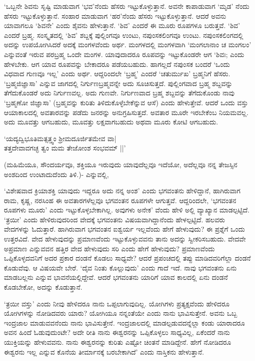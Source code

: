 `ಒಬ್ಬನೇ ಶಿವನು ಸೃಷ್ಟಿ ಮಾಡುವಾಗ `ಭವ'ನೆಂದು ಹೆಸರು ಇಟ್ಟುಕೊಳ್ಳುತ್ತಾನೆ. ಅವನೇ ಕಾಪಾಡುವಾಗ `ಮೃಡ' ನೆಂದು ಹೆಸರು ಇಟ್ಟುಕೊಳ್ಳುತ್ತಾನೆ. ಸಂಹಾರ ಮಾಡುವಾಗ `ಹರ'ನೆಂದು ಹೆಸರು ಇಟ್ಟುಕೊಳ್ಳುತ್ತಾನೆ. ಆದರೆ ಅವನು ಯಾವಾಗಲೂ `ಶಿವನೇ' ಎಂದು ಶೈವನು ಹೇಳುತ್ತಾನೆ. `ಶಿವ' ಎಂದರೆ ಈ ಮೂರು ರೂಪಗಳೂ ಬರುತ್ತವೆ. `ಶಿವ' ಎಂದರೆ ಬ್ರಹ್ಮ. ಸಂಸ್ಕೃತದಲ್ಲಿ `ಶಿವ' ಶಬ್ದಕ್ಕೆ ಪುಲ್ಲಿಂಗವೂ ಉಂಟು, ನಪುಂಸಕಲಿಂಗವೂ ಉಂಟು. ನಪುಂಸಕಲಿಂಗದಲ್ಲಿ ಅದನ್ನು ಉಪಯೋಗಿಸಿದರೆ ಅದಕ್ಕೆ ಮಂಗಳವೆಂದು ಅರ್ಥ. ಮಂಗಳದಲ್ಲಿ ಮಂಗಳವಾಗಿ `ಮಂಗಲಾನಾಂ ಚ ಮಂಗಲಂ' ಎನ್ನುವಂತೆ ಇರುವ ಪರಬ್ರಹ್ಮ ಒಂದೇ ಮಂಗಳ. ಯಾವುದಾದರೂ ರೂಪವನ್ನು ಇಟ್ಟುಕೊಂಡರೇ ಆಗ `ಶಿವಃ; ಎಂದು ಹೇಳಬೇಕು. ಆಗ ಯಾವ ರೂಪವನ್ನು ಬೇಕಾದರೂ ಪಡೆಯಬಹುದು. ಹಾಗಲ್ಲದೆ ನಪುಂಸಕ ಬಂದರೆ `ಒಂದು ವಿಧವಾದ ಗುಣವೂ ಇಲ್ಲ' ಎಂದು ಅರ್ಥ. ಆದ್ದರಿಂದಲೇ `ಬ್ರಹ್ಮ' ಎಂದರೆ `ಚತುರ್ಮುಖ' ಬ್ರಹ್ಮನಿಗೆ ಹೆಸರು. `ಬ್ರಹ್ಮಜಿಜ್ಞಾಸಾ' ಎನ್ನುವ ಜಾಗದಲ್ಲಿ ನಿರ್ಗುಣಬ್ರಹ್ಮವನ್ನೇ ಅದು ಸೂಚಿಸುತ್ತದೆ. ಪುಲ್ಲಿಂಗವಾದ ಬ್ರಹ್ಮ ಶಬ್ದವನ್ನು ತೆಗೆದುಕೊಂಡರೆ ಅದು ನಿರ್ಗುಣವಲ್ಲ. ಅದು ಗುಣವೇ. ನಿರ್ಗುಣವಾದ ಬ್ರಹ್ಮ ಶಬ್ದವನ್ನು ತೆಗೆದುಕೊಂಡು ನಾವು `ಬ್ರಹ್ಮಣೋ ಜಿಜ್ಞಾಸಾ' (ಬ್ರಹ್ಮವನ್ನು ಕುರಿತು ತಿಳಿದುಕೊಳ್ಳೆಬೇಕೆನ್ನುವ ಆಸೆ) ಎಂದು ಹೇಳುತ್ತೇವೆ. ಆದರೆ ಒಂದು ವಸ್ತು ಆಯಾಕಾಲದಲ್ಲಿ ಅವತಾರವನ್ನು ಪಡೆದು ಜನರನ್ನು ಅನುಗ್ರಹಿಸುತ್ತದೆ. ಅವತಾರ ಮೂರೇ ಇರಬೇಕೆಂಬ ನಿಯಮವಲ್ಲ. ಅದು ಮೂವತ್ತು ಆಗಬಹುದು, ಮೂವತ್ತು ಲಕ್ಷವಾಗಬಹುದು ಅಥವಾ ಮೂರು ಕೋಟಿ ಆಗಬಹುದು.

\begin{shloka}
`ಯದ್ಯದ್ವಿಭೂತಿಮತ್ಸತ್ತ್ವಂ ಶ್ರೀಮದೂರ್ಜಿತಮೇವ ವಾ‌|\\
ತತ್ತದೇವಾವಗಚ್ಛ ತ್ವಂ ಮಮ ತೇಜೋಂಶ ಸಂಭವಮ್ ||'
\end{shloka}

(ಮಹಿಮೆಯೂ, ಸೌಂದರ್ಯವೂ, ಶಕ್ತಿಯೂ ಇರುವುದು ಯಾವುದೆಲ್ಲವೂ ಇದೆಯೋ, ಅದೆಲ್ಲವೂ ನನ್ನ ತೇಜಸ್ಸಿನ ಅಂಶದಿಂದ ಉಂಟಾದುದೆಂದು ತಿಳಿ.)- ಎನ್ನುವಲ್ಲಿ,

`ವಿಶೇಷವಾದ ಕ್ರಿಯಾಶಕ್ತಿ ಯಾವುದು ಇದ್ದರೂ ಅದು ನನ್ನ ಅಂಶ' ಎಂದು ಭಗವಂತನು ಹೇಳಿದ್ದಾನೆ, ಹಾಗಿರುವಾಗ ರಾಮ, ಕೃಷ್ಣ, ನರಸಿಂಹ ಈ ಅವತಾರಗಳೆಲ್ಲವೂ ಭಗವಂತನ ರೂಪಗಳೇ ಆಗುತ್ತವೆ. ಆದ್ದರಿಂದಲೇ, `ಭಗವಂತನ ರೂಪಗಳು ಮೂರು' ಎಂದು ಇಟ್ಟುಕೊಳ್ಳಬೇಕಾಗಿಲ್ಲ. ಅವುಗಳು ಅನೇಕ' ವೆಂದು ಹೇಳಿ ಅಲ್ಲಿ ವ್ಯಾಖ್ಯಾನ ಮಾಡಲ್ಪಟ್ಟಿದೆ. `ತ್ರಯೀ' ಎಂದು ಹೇಳಿರುವುದರಿಂದ ವೇದಕ್ಕೆ ಭಗವಂತನು ವಿಷಯವಾಗಿದ್ದಾನೆಂದು ಹೇಳಲ್ಪಟ್ಟಿದೆ. ಹಲವರು ವೇದಗಳನ್ನು ಓದುತ್ತಾರೆ. ಹಾಗಿರುವಾಗ ಭಗವಂತನ ಐಶ್ವರ್ಯ ಇಲ್ಲವೆಂದು ಹೇಗೆ ಹೇಳುವುದು? ಈ ಪ್ರಶ್ನೆಗೆ ಒಂದು ಉತ್ತರವಿದೆ. ವೇದ ಹೇಳುವುದನ್ನು ಪ್ರಮಾಣವೆಂದು ಇಟ್ಟುಕೊಳ್ಳುವವನು ತಾನು ಅದನ್ನು  ಸ್ವೀಕರಿಸಬಹುದು. ವೇದವೇ ಅಪ್ರಮಾಣ ಎನ್ನುವವನ ಹತ್ತಿರ ವೇದ ಹೇಳುವುದು ಸರಿ ಎಂದು ಹೇಗೆ ಹೇಳುವುದು? ಪ್ರಮಾಣವೆಂದು ಒಪ್ಪಿಕೊಳ್ಳದವನಿಗೆ ಅದರ ಪ್ರಕಾರ ದಂಡನೆ ಕೊಡಲು ಸಾಧ್ಯವೇ? ಆದರೆ ಪ್ರಪಂಚದಲ್ಲಿ ತಪ್ಪು ಮಾಡಿದವರಿಗೆಲ್ಲಾ ದಂಡನೆ ಕೊಡುವೆವು. ಆ ವಿಷಯವೇ ಬೇರೆ. `ದೈವ ನಿಂತು ಕೊಲ್ಲುವುದು' ಎಂದು ಗಾದೆ ಇದೆ. ನಾವು ಭಗವಂತನು ಏನು ಮಾಡಬಲ್ಲನು ಎನ್ನುವ ಭಾವನೆಯಲ್ಲಿದ್ದೇವೆ. ಆದರೆ ಭಗವಂತನು ಯಾರಿಗೆ ಯಾವ ಕಾಲದಲ್ಲಿ ಏನು ದಂಡನೆ ಕೊಡಬೇಕೋ, ಅದನ್ನು ಕೊಡುತ್ತಾನೆ.

`ತ್ರಯೀ ವಸ್ತು' ಎಂದು ನೀವು ಹೇಳಿದರೂ ನಾನು ಒಪ್ಪಲಾಗುವುದಿಲ್ಲ. ಯೋಗಿಗಳು ಪ್ರತ್ಯಕ್ಷವೆಂದು ಹೇಳಿದರೂ ಯೋಗಿಗಳನ್ನು ನೋಡಿದವರು ಯಾರು? ಯೋಗಿಯೂ ನನ್ನಂತೆಯೇ ಎಂದು ನಾನು ಭಾವಿಸುತ್ತೇನೆ. ಅವನು ಒಬ್ಬ ಇಂದ್ರಜಾಲ ಮಾಡುವವನೆಂದು ನಾನು ಭಾವಿಸುತ್ತೇನೆ. ಇಂದ್ರಜಾಲದಲ್ಲಿ ಮಾಡಲ್ಪಡುವದನ್ನೆಲ್ಲಾ ಕಂಡು ಯಾರಾದರೂ ಅವನ ಹಿಂದೆ ಓಡುವುದುಂಟೇ? ಅದೇ ರೀತಿ ನಾನು ಈಶ್ವರನನ್ನು ಒಪ್ಪಿಕೊಳ್ಳಲು ಸಾಧ್ಯವಿಲ್ಲ, ಏಕೆಂದರೆ ನಾನು ಯುಕ್ತಿಯನ್ನು ಹೇಳುವವನು. ನಾನು ಈಶ್ವರನನ್ನು ಕುರಿತು ಎಷ್ಟೋ ಚಿಂತನೆ ಮಾಡಿದ್ದೇನೆ. ಹೇಗೆ ನೋಡಿದರೂ ಈಶ್ವರನು ಇಲ್ಲ ಎನ್ನುವ ಕೊನೆಯ ತೀರ್ಮಾನಕ್ಕೆ ಬರಬೇಕಾಗಿದೆ' ಎಂದು ನಾಸ್ತಿಕನು ಹೇಳುತ್ತಾನೆ.

